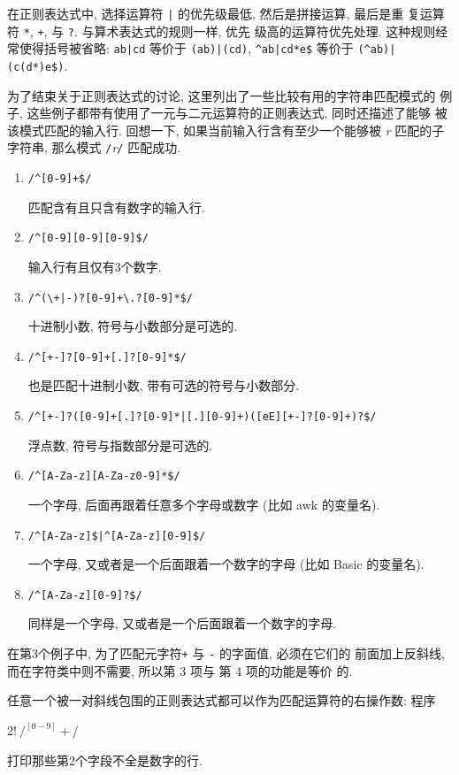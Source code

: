 在正则表达式中, 选择运算符 \verb'|' 的优先级最低, 然后是拼接运算, 最后是重
复运算符 \verb'*', \verb'+', 与 \verb'?'. 与算术表达式的规则一样, 优先
级高的运算符优先处理. 这种规则经常使得括号被省略: \verb'ab|cd' 等价于
\verb'(ab)|(cd)', \verb'^ab|cd*e$' 等价于 \verb'(^ab)|(c(d*)e$)'.

为了结束关于正则表达式的讨论, 这里列出了一些比较有用的字符串匹配模式的
例子, 这些例子都带有使用了一元与二元运算符的正则表达式, 同时还描述了能够
被该模式匹配的输入行. 回想一下, 如果当前输入行含有至少一个能够被
\textit{r} 匹配的子字符串, 那么模式 \verb'/'\textit{r}\verb'/'
匹配成功.
\begin{enumerate}
\item[] \verb'/^[0-9]+$/' \par
    \qquad 匹配含有且只含有数字的输入行.
\item[] \verb'/^[0-9][0-9][0-9]$/' \par
    \qquad 输入行有且仅有3个数字.
\item[] \verb'/^(\+|-)?[0-9]+\.?[0-9]*$/' \par
    \qquad 十进制小数, 符号与小数部分是可选的.
\item[] \verb'/^[+-]?[0-9]+[.]?[0-9]*$/' \par
    \qquad 也是匹配十进制小数, 带有可选的符号与小数部分.
\item[] \verb'/^[+-]?([0-9]+[.]?[0-9]*|[.][0-9]+)([eE][+-]?[0-9]+)?$/' \par
    \qquad 浮点数, 符号与指数部分是可选的.
\item[] \verb'/^[A-Za-z][A-Za-z0-9]*$/' \par
    \qquad 一个字母, 后面再跟着任意多个字母或数字 (比如 awk 的变量名).
\item[] \verb'/^[A-Za-z]$|^[A-Za-z][0-9]$/' \par
    \qquad 一个字母, 又或者是一个后面跟着一个数字的字母 (比如 Basic 的变量名).
\item[] \verb'/^[A-Za-z][0-9]?$/' \par
    \qquad 同样是一个字母, 又或者是一个后面跟着一个数字的字母.
\end{enumerate}
在第3个例子中, 为了匹配元字符\verb'+' 与 \verb'-' 的字面值, 必须在它们的
前面加上反斜线, 而在字符类中则不需要, 所以第 3 项与 第 4 项的功能是等价
的.

任意一个被一对斜线包围的正则表达式都可以作为匹配运算符的右操作数: 程序
\begin{awkcode}
    $2 !~ /^[0-9]+$/
\end{awkcode}
打印那些第2个字段不全是数字的行.

